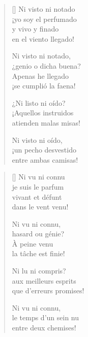 



\settowidth{\versewidth}{¿genio o dicha buena?}
\bigskip

\begin{verse}[\versewidth]
  Ni visto ni notado \\
  ¡yo soy el perfumado \\
  y vivo y finado \\
  en el viento llegado!

  Ni visto ni notado, \\
  ¿genio o dicha buena? \\
  Apenas he llegado \\
  ¡se cumplió la faena!

  ¿Ni listo ni oído? \\
  ¡Aquellos instruidos \\
  atienden malas misas!

  Ni visto ni oído, \\
  ¡un pecho desvestido \\
  entre ambas camisas!
\end{verse}

\newpage



\settowidth{\versewidth}{Que d'erreurs promises!}

\bigskip

{\itshape
\begin{verse}[\versewidth]
  Ni vu ni connu \\
  je suis le parfum \\
  vivant et défunt \\
  dans le vent venu!

  Ni vu ni connu, \\
  hasard ou génie? \\
  À peine venu \\
  la tâche est finie!

  Ni lu ni compris? \\
  aux meilleurs esprits \\
  que d'erreurs promises!

  Ni vu ni connu, \\
  le temps d'un sein nu \\
  entre deux chemises!
\end{verse}
}
